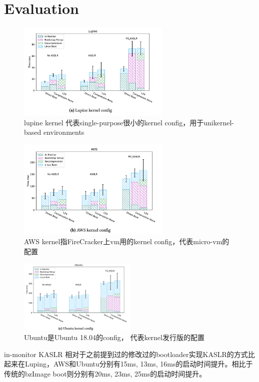 \documentclass[
    aspectratio=169,  %
]{ctexbeamer}
\begin{document}
\part{Evaluation}

\begin{frame}
\begin{figure}
	\centering
	\includegraphics[width=0.65\textwidth]{img/lupin_eval.png}
  \caption{lupine kernel 代表single-purpose很小的kernel config，用于unikernel-based environments}
\end{figure}

\end{frame}

\begin{frame}
\begin{figure}
	\centering
	\includegraphics[width=0.65\textwidth]{img/aws_eval.png}
  \caption{AWS kernel指FireCracker上vm用的kernel config，代表micro-vm的配置}
\end{figure}

\end{frame}


\begin{frame}
\begin{figure}
	\centering
	\includegraphics[width=0.5\textwidth]{img/ubuntu_eval.png}
  \caption{ Ubuntu是Ubuntu 18.04的config， 代表kernel发行版的配置}
\end{figure}
in-monitor KASLR 相对于之前提到过的修改过的bootloader实现KASLR的方式比起来在Luping，AWS和Ubuntu分别有15ms, 13ms, 16ms的启动时间提升。相比于传统的bzImage boot则分别有20ms, 23ms, 25ms的启动时间提升。

\end{frame}
\end{document}
